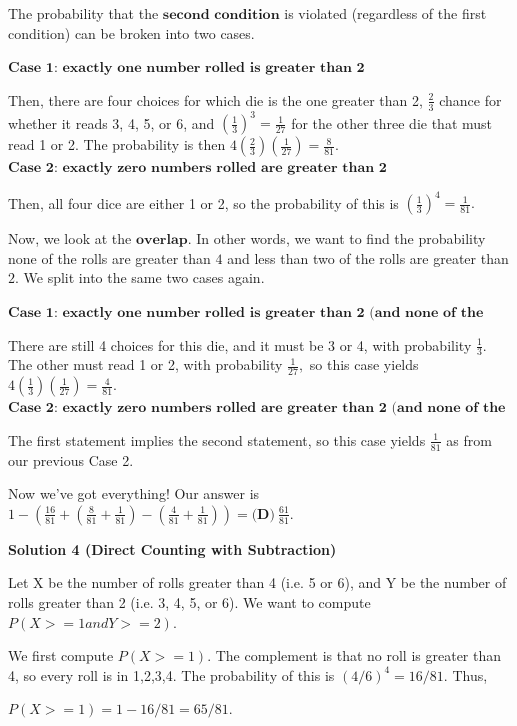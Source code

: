 \begin{enumerate}
 The probability that the $\textbf{second condition}$ is violated (regardless of the first condition) can be broken into two cases.

 $\textbf{Case 1: exactly one number rolled is greater than 2}$

 Then, there are four choices for which die is the one greater than 2, $\frac{2}{3}$ chance for whether it reads 3, 4, 5, or 6, and $\left(\frac{1}{3}\right)^3 = \frac{1}{27}$ for the other three die that must read 1 or 2. The probability is then $4\left(\frac{2}{3}\right)\left(\frac{1}{27}\right) = \frac{8}{81}.$
$\textbf{Case 2: exactly zero numbers rolled are greater than 2}$

 Then, all four dice are either 1 or 2, so the probability of this is $\left(\frac{1}{3}\right)^4 = \frac{1}{81}.$

 Now, we look at the $\textbf{overlap}$. In other words, we want to find the probability none of the rolls are greater than $4$ and less than two of the rolls are greater than $2$. We split into the same two cases again.

 $\textbf{Case 1: exactly one number rolled is greater than 2 (and none of the rolls are greater than 4)}$

 There are still 4 choices for this die, and it must be 3 or 4, with probability $\frac{1}{3}$. The other must read 1 or 2, with probability $\frac{1}{27},$ so this case yields $4\left(\frac{1}{3}\right)\left(\frac{1}{27}\right) = \frac{4}{81}.$
$\textbf{Case 2: exactly zero numbers rolled are greater than 2 (and none of the rolls are greater than 4)}$

 The first statement implies the second statement, so this case yields $\frac{1}{81}$ as from our previous Case 2.

 Now we've got everything! Our answer is $1 - (\frac{16}{81} + (\frac{8}{81} + \frac{1}{81}) - (\frac{4}{81} + \frac{1}{81})) = \boxed{\textbf{(D)}\ \frac{61}{81}}.$




\textbf{Solution 4 (Direct Counting with Subtraction)}

Let X be the number of rolls greater than 4 (i.e. 5 or 6), and Y be the number of rolls greater than 2 (i.e. 3, 4, 5, or 6). We want to compute $P(X >= 1 and Y >= 2)$.

 We first compute $P(X >= 1)$. The complement is that no roll is greater than 4, so every roll is in {1,2,3,4}. The probability of this is $(4/6)^4 = 16/81$. Thus,

 $P(X >= 1) = 1 - 16/81 = 65/81$.


\end{enumerate}
